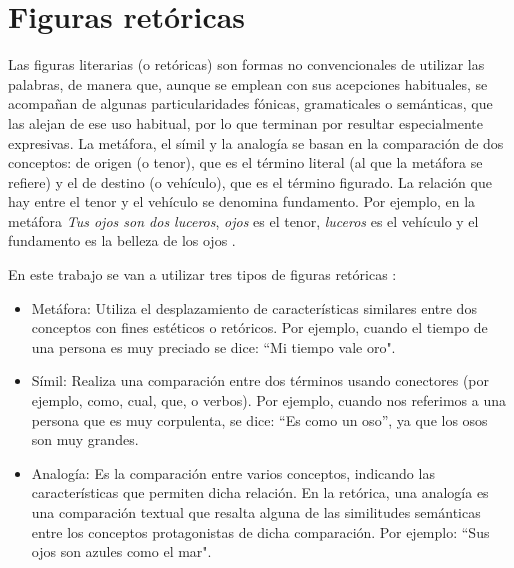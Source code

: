 


\section{Figuras retóricas}
\label{cap:sec:figurasretoricas}

Las figuras literarias (o retóricas) son formas no convencionales de utilizar las palabras, de manera que, aunque se emplean con sus acepciones habituales, se acompañan de algunas particularidades fónicas, gramaticales o semánticas, que las alejan de ese uso habitual, por lo que terminan por resultar especialmente expresivas. 
La metáfora, el símil y la analogía se basan en la comparación de dos conceptos: de origen (o tenor), que es el término literal (al que la metáfora se refiere) y el de destino (o vehículo), que es el término figurado. La relación que hay entre el tenor y el vehículo se denomina fundamento. Por ejemplo, en la metáfora \textit{Tus ojos son dos luceros}, \textit{ojos} es el tenor, \textit{luceros} es el vehículo y el fundamento es la belleza de los ojos \citep{GalianaYCasas1994}.


En este trabajo se van a utilizar tres tipos de figuras retóricas \citep{TFMPaloma}: 
\begin{itemize}
	\item Metáfora: Utiliza el desplazamiento de características similares entre dos conceptos con fines estéticos o retóricos. Por ejemplo, cuando el tiempo de una persona es muy preciado se dice: ``Mi tiempo vale oro".
	
	\item Símil: Realiza una comparación entre dos términos usando conectores (por ejemplo, como, cual, que, o verbos).
	Por ejemplo, cuando nos referimos a una persona que es muy corpulenta, se dice: ``Es como un oso'', ya que los osos son muy grandes.
	
	\item Analogía: Es la comparación entre varios conceptos, indicando las características que permiten dicha relación. En la retórica, una analogía es una comparación textual que resalta alguna de las similitudes semánticas entre los conceptos protagonistas de dicha comparación. Por ejemplo: ``Sus ojos son azules como el mar".
	
	
	
\end{itemize}

